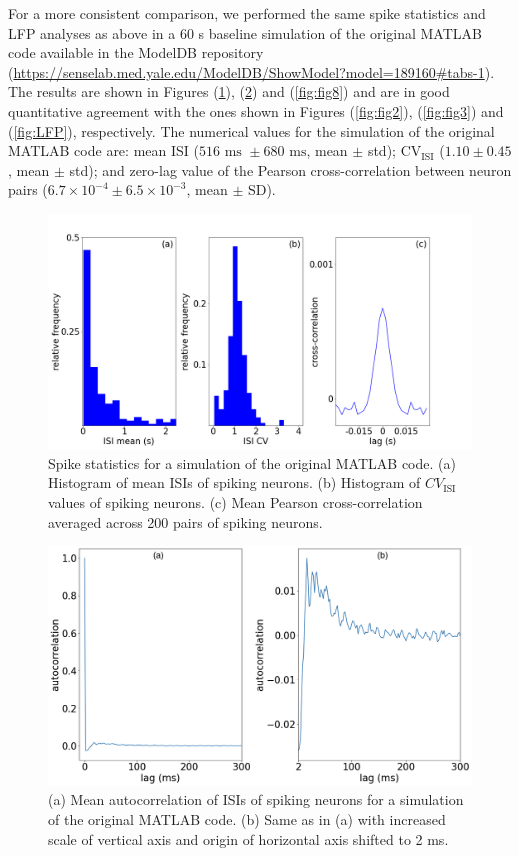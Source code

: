 For a more consistent comparison, we performed the same spike statistics and LFP analyses as above in a 60 s baseline simulation of the original MATLAB code available in the ModelDB repository (\url{https://senselab.med.yale.edu/ModelDB/ShowModel?model=189160#tabs-1}). The results are shown in Figures (\ref{fig:fig6}), (\ref{fig:fig7}) and (\ref{fig:fig8}) and are in good quantitative agreement with the ones shown in Figures (\ref{fig:fig2}), (\ref{fig:fig3}) and (\ref{fig:LFP}), respectively. The numerical values for the simulation of the original MATLAB code are: mean ISI ($516 \text{ ms } \pm 680 \text{ ms}$, mean $\pm$ std); CV$_{\text{ISI}}$ ($1.10 \pm 0.45$, mean $\pm$ std); and zero-lag value of the Pearson cross-correlation between neuron pairs ($6.7 \times 10^{-4} \pm 6.5 \times 10^{-3}$, mean $\pm$ SD). \\

\begin{figure}[H]
    \centering
    \includegraphics[scale=0.30]{Figures/Fig6.png}
    \caption{Spike statistics for a simulation of the original MATLAB code. (a) Histogram of mean ISIs of spiking neurons. (b) Histogram of $CV_{\text{ISI}}$ values of spiking neurons. (c) Mean Pearson cross-correlation averaged across 200 pairs of spiking neurons.}
    \label{fig:fig6}
\end{figure}

\begin{figure}[H]
    \centering
    \includegraphics[scale=0.30]{Figures/Fig7.png}
    \caption{(a) Mean autocorrelation of ISIs of spiking neurons for a simulation of the original MATLAB code. (b) Same as in (a) with increased scale of vertical axis and origin of horizontal axis shifted to 2 ms.}
    \label{fig:fig7}
\end{figure}

